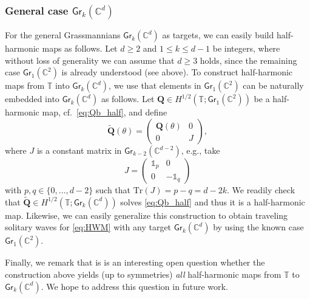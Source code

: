 \documentclass[10pt,reqno,a4paper]{amsart}
\theoremstyle{definition}
\theoremstyle{remark}
\theoremstyle{remark}
\numberwithin{equation}{section}
\newcommand{\C}{\mathbb{C}}
\newcommand{\T}{\mathbb{T}}
\newcommand{\Tr}{\mathrm{Tr}}
\newcommand{\Gr}{\mathsf{Gr}}
\newcommand{\Qb}{\mathbf{Q}}
\begin{document}
\begin{appendix}
\subsubsection*{General case $\Gr_k(\C^d)$} For the general Grassmannians $\Gr_k(\C^d)$ as targets, we can easily build half-harmonic maps as follows. Let $d \geq 2$ and $1 \leq k \leq d-1$ be integers, where without loss of generality we can assume that $d \geq 3$ holds, since the remaining case $\Gr_1(\C^2)$ is already understood (see above). To construct half-harmonic maps from $\T$ into $\Gr_k(\C^d)$, we use that elements in $\Gr_1(\C^2)$ can be naturally embedded into $\Gr_k(\C^d)$ as follows. Let $\Qb \in H^{1/2}(\T; \Gr_1(\C^2))$ be a half-harmonic map, cf.~\eqref{eq:Qb_half}, and define 
$$
\widetilde{\Qb}(\theta) = \left ( \begin{array}{cc} \Qb(\theta) & 0 \\ 0 & J  \end{array} \right ),
$$ 
where $J$ is a constant matrix in $\Gr_{k-2}(\C^{d-2})$, e.g., take 
$$
J=\left ( \begin{array}{cc} \mathds{1}_p & 0 \\ 0 & -\mathds{1}_q  \end{array} \right )
$$ 
with $p,q \in \{0,\ldots, d-2 \}$ such that $\Tr(J) = p-q = d-2k$. We readily check that $\widetilde{\Qb} \in H^{1/2}(\T; \Gr_k(\C^d))$ solves \eqref{eq:Qb_half} and thus it is a half-harmonic map. Likewise, we can easily generalize this construction to obtain traveling solitary waves for \eqref{eq:HWM} with any target $\Gr_k(\C^d)$ by using the known case $\Gr_1(\C^2)$.

Finally, we remark that is is an interesting open question whether the construction above yields (up to symmetries) {\em all} half-harmonic maps from $\T$ to $\Gr_k(\C^d)$. We hope to address this question in future work.


\end{appendix}






\end{document}
